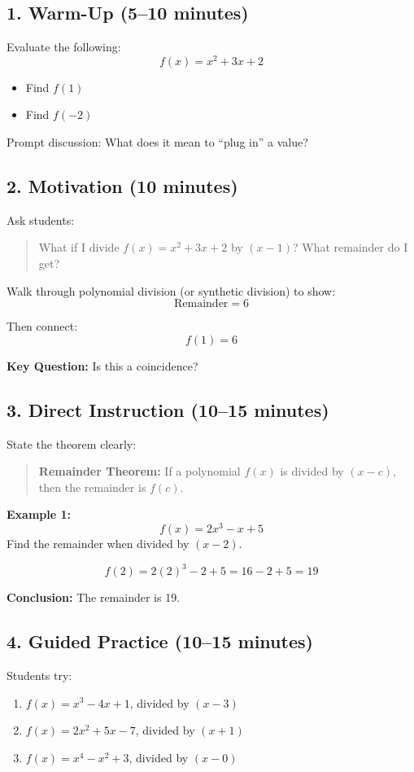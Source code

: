 \documentclass[10pt]{article}
\begin{document}
\subsection*{1. Warm-Up (5--10 minutes)}
Evaluate the following:
\[
f(x) = x^2 + 3x + 2
\]
\begin{itemize}
    \item Find $f(1)$
    \item Find $f(-2)$
\end{itemize}

Prompt discussion: What does it mean to ``plug in'' a value?

\subsection*{2. Motivation (10 minutes)}
Ask students:
\begin{quote}
What if I divide $f(x) = x^2 + 3x + 2$ by $(x - 1)$? What remainder do I get?
\end{quote}

Walk through polynomial division (or synthetic division) to show:
\[
\text{Remainder} = 6
\]

Then connect:
\[
f(1) = 6
\]

\textbf{Key Question:} Is this a coincidence?

\subsection*{3. Direct Instruction (10--15 minutes)}
State the theorem clearly:

\begin{quote}
\textbf{Remainder Theorem:}  
If a polynomial $f(x)$ is divided by $(x - c)$, then the remainder is $f(c)$.
\end{quote}

\textbf{Example 1:}
\[
f(x) = 2x^3 - x + 5
\]
Find the remainder when divided by $(x - 2)$.

\[
f(2) = 2(2)^3 - 2 + 5 = 16 - 2 + 5 = 19
\]

\textbf{Conclusion:} The remainder is 19.

\subsection*{4. Guided Practice (10--15 minutes)}

Students try:

\begin{enumerate}[label=\arabic*.]
    \item $f(x) = x^3 - 4x + 1$, divided by $(x - 3)$
    \item $f(x) = 2x^2 + 5x - 7$, divided by $(x + 1)$
    \item $f(x) = x^4 - x^2 + 3$, divided by $(x - 0)$
\end{enumerate}
\end{document}
